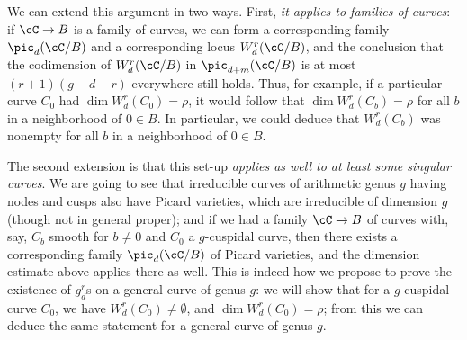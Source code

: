 We can extend this argument in two ways. First, \emph{it applies to families of curves}: if $\cC \to B$ is a family of curves, we can form a corresponding family $\pic_d(\cC / B)$ and a corresponding locus $W^r_d(\cC / B)$, and the conclusion that the codimension of $W^r_d(\cC / B)$ in $\pic_{d+m}(\cC / B)$ is at most $(r+1)(g-d+r)$ everywhere still holds. Thus, for example, if a particular curve $C_0$ had $\dim W^r_d(C_0) = \rho$, it would follow that $\dim W^r_d(C_b) = \rho$ for all $b$ in a neighborhood of $0 \in B$. In particular, we could deduce that $W^r_d(C_b)$ was nonempty for all $b$ in a neighborhood of $0 \in B$.

The second extension is that this set-up \emph{applies as well to at least some singular curves}. We are going to see that irreducible curves of arithmetic genus $g$ having nodes and cusps also have Picard varieties, which are irreducible of dimension $g$ (though not in general proper); and if we had a family $\cC \to B$ of curves with, say, $C_b$ smooth for $b \neq 0$ and $C_0$ a $g$-cuspidal curve, then there exists a corresponding family $\pic_d(\cC/B)$ of Picard varieties, and the dimension estimate above applies there as well. This is indeed how we propose to prove the existence of $g^r_d$s on a general curve of genus $g$: we will show that for a $g$-cuspidal curve $C_0$,  we have $W^r_d(C_0) \neq \emptyset$, and  $\dim W^r_d(C_0) = \rho$; from this we can deduce the same statement for a general curve of genus $g$.



%
%
%

